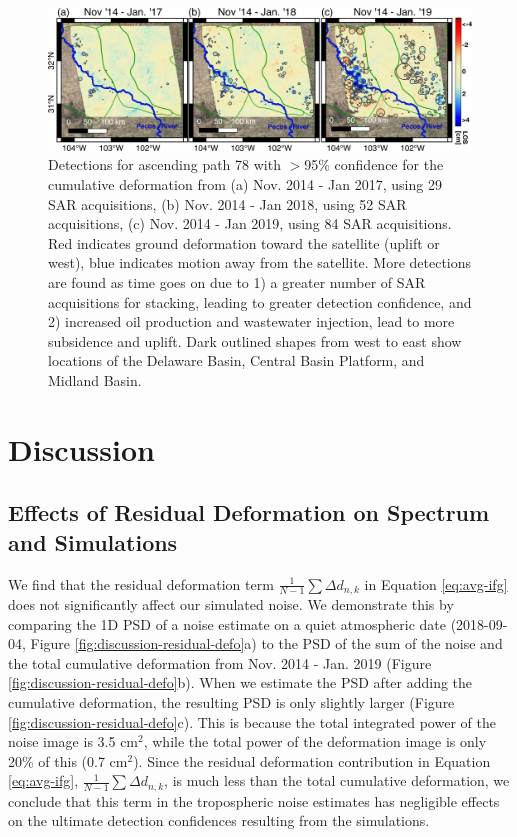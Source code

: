 \documentclass{utexasthesis}
\begin{document}
\begin{figure}[hbt!]
\centering 
\includegraphics[width=0.98\linewidth]{paper2/figures/figure_results_blobs_path78.png}
\caption{
Detections for ascending path 78 with $ > $95\% confidence for the cumulative deformation from (a) Nov. 2014 - Jan 2017, using 29 SAR acquisitions, (b) Nov. 2014 - Jan 2018, using 52 SAR acquisitions,  (c) Nov. 2014 - Jan 2019, using 84 SAR acquisitions. Red indicates ground deformation toward the satellite (uplift or west), blue indicates motion away from the satellite. More detections are found as time goes on due to 1) a greater number of SAR acquisitions for stacking, leading to greater detection confidence, and 2) increased oil production and wastewater injection, lead to more subsidence and uplift. 
Dark outlined shapes from west to east show locations of the Delaware Basin, Central Basin Platform, and Midland Basin.
}
\label{fig:results-detections}
\end{figure}



\section{Discussion}
\label{sec:discussion}



\subsection{Effects of Residual Deformation on Spectrum and Simulations}
\label{subsec:discussion-residual-deformation}
We find that the residual deformation term $  \frac{1}{N-1}  \sum  \Delta d_{n,k} $ in Equation \eqref{eq:avg-ifg} does not significantly affect our simulated noise. We demonstrate this by comparing the 1D PSD of a noise estimate on a quiet atmospheric date (2018-09-04, Figure \ref{fig:discussion-residual-defo}a) to the PSD of the sum of the noise and the total cumulative deformation from Nov. 2014 - Jan. 2019 (Figure \ref{fig:discussion-residual-defo}b). When we estimate the PSD after adding the cumulative deformation, the resulting PSD is only slightly larger (Figure \ref{fig:discussion-residual-defo}c). This is because the total integrated power of the noise image is 3.5 cm$^2 $, while the total power of the deformation image is only 20\% of this (0.7 cm$^2 $). Since the residual deformation contribution in Equation \eqref{eq:avg-ifg}, $ \frac{1}{N-1}  \sum  \Delta d_{n,k} $, is much less than the total cumulative deformation, we conclude that this term in the tropospheric noise estimates has negligible effects on the ultimate detection confidences resulting from the simulations.
\end{document}
